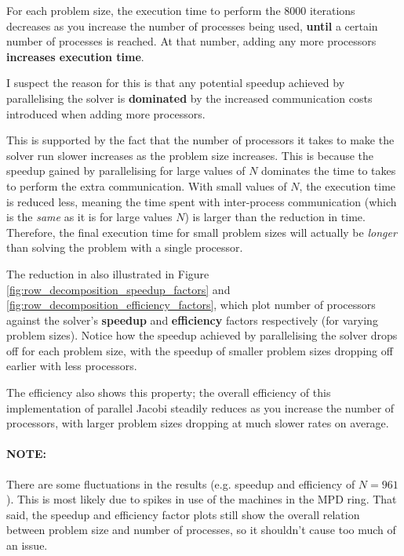 \documentclass{article}
\begin{document}
For each problem size, the execution time to perform the 8000 iterations decreases as you increase the number of processes being used, \textbf{until} a certain number of processes is reached. At that number, adding any more processors \textbf{increases execution time}.

I suspect the reason for this is that any potential speedup achieved by parallelising the solver is \textbf{dominated} by the increased communication costs introduced when adding more processors. 

This is supported by the fact that the number of processors it takes to make the solver run slower increases as the problem size increases. This is because the speedup gained by parallelising for large values of $N$ dominates the time to takes to perform the extra communication. With small values of $N$, the execution time is reduced less, meaning the time spent with inter-process communication (which is the \textit{same} as it is for large values $N$) is larger than the reduction in time. Therefore, the final execution time for small problem sizes will actually be \textit{longer} than solving the problem with a single processor.

The reduction in also illustrated in Figure \ref{fig:row_decomposition_speedup_factors} and \ref{fig:row_decomposition_efficiency_factors}, which plot number of processors against the solver's \textbf{speedup} and \textbf{efficiency} factors respectively (for varying problem sizes). Notice how the speedup achieved by parallelising the solver drops off for each problem size, with the speedup of smaller problem sizes dropping off earlier with less processors.

The efficiency also shows this property; the overall efficiency of this implementation of parallel Jacobi steadily reduces as you increase the number of processors, with larger problem sizes dropping at much slower rates on average.

\paragraph{\textbf{NOTE:}} There are some fluctuations in the results (e.g. speedup and efficiency of $N = 961$). This is most likely due to spikes in use of the machines in the MPD ring. That said, the speedup and efficiency factor plots still show the overall relation between problem size and number of processes, so it shouldn't cause too much of an issue.
\end{document}
